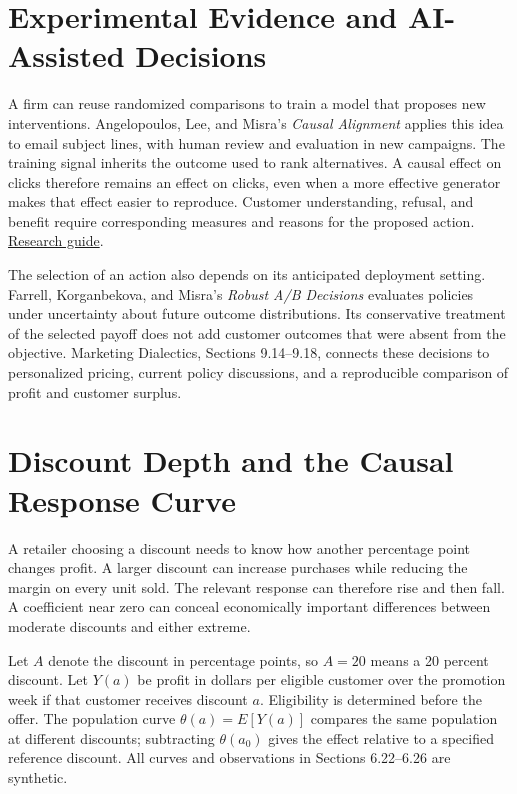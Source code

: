 \hypertarget{M06-experimental-evidence-and-ai-assisted-decisions}{%
\section{Experimental Evidence and AI-Assisted
Decisions}\label{M06-experimental-evidence-and-ai-assisted-decisions}}

\noindent A firm can reuse randomized comparisons to train a model that proposes
new interventions. Angelopoulos, Lee, and Misra's \emph{Causal
Alignment} applies this idea to email subject lines, with human review
and evaluation in new campaigns. The training signal inherits the
outcome used to rank alternatives. A causal effect on clicks therefore
remains an effect on clicks, even when a more effective generator makes
that effect easier to reproduce. Customer understanding, refusal, and
benefit require corresponding measures and reasons for the proposed
action.
\href{../01_Resources/16_AI_Experimentation_and_Pricing/README.md}{Research
guide}.

The selection of an action also depends on its anticipated deployment
setting. Farrell, Korganbekova, and Misra's \emph{Robust A/B Decisions}
evaluates policies under uncertainty about future outcome distributions.
Its conservative treatment of the selected payoff does not add customer
outcomes that were absent from the objective. Marketing Dialectics,
Sections 9.14--9.18, connects these decisions to personalized pricing,
current policy discussions, and a reproducible comparison of profit and
customer surplus.

\hypertarget{M06-discount-depth-and-the-causal-response-curve}{%
\section{Discount Depth and the Causal Response
Curve}\label{M06-discount-depth-and-the-causal-response-curve}}

\noindent \noindent A retailer choosing a discount needs to know how another
percentage point changes profit. A larger discount can increase
purchases while reducing the margin on every unit sold. The relevant
response can therefore rise and then fall. A coefficient near zero can
conceal economically important differences between moderate discounts
and either extreme.

Let \(A\) denote the discount in percentage points, so \(A=20\) means a
20 percent discount. Let \(Y(a)\) be profit in dollars per eligible
customer over the promotion week if that customer receives discount
\(a\). Eligibility is determined before the offer. The population curve
\(\theta(a)=E[Y(a)]\) compares the same population at different
discounts; subtracting \(\theta(a_0)\) gives the effect relative to a
specified reference discount. All curves and observations in Sections
6.22--6.26 are synthetic.

